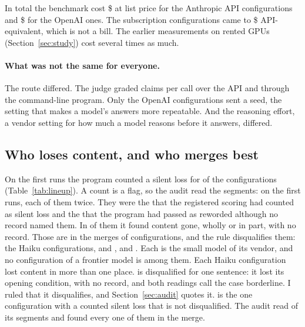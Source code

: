 In total the benchmark cost \$ at list price for the Anthropic API configurations and \$ for the OpenAI ones. The subscription configurations came to \$ API-equivalent, which is not a bill. The earlier measurements on rented GPUs (Section~\ref{sec:study}) cost several times as much.

\paragraph{What was not the same for everyone.} The route differed. The judge graded  claims per call over the API and  through the command-line program. Only the OpenAI configurations sent a seed, the setting that makes a model's answers more repeatable. And the reasoning effort, a vendor setting for how much a model reasons before it answers, differed.

\subsection{Who loses content, and who merges best}
\label{sec:lineup}

On the first runs the program counted a silent loss for  of the  configurations (Table~\ref{tab:lineup}). A count is a flag, so the audit read the segments:  on the first runs, each of them twice. They were the  that the registered scoring had counted as silent loss and the  that the program had passed as reworded although no record named them. In  of them it found content gone, wholly or in part, with no record. Those  are in the merges of  configurations, and the rule disqualifies them: the Haiku configurations, \texttt{} and \texttt{}, and \texttt{}. Each is the small model of its vendor, and no configuration of a frontier model is among them. Each Haiku configuration lost content in more than one place. \texttt{} is disqualified for one sentence: it lost its opening condition, with no record, and both readings call the case borderline. I ruled that it disqualifies, and Section~\ref{sec:audit} quotes it. \texttt{} is the one configuration with a counted silent loss that is not disqualified. The audit read  of its segments and found every one of them in the merge.


